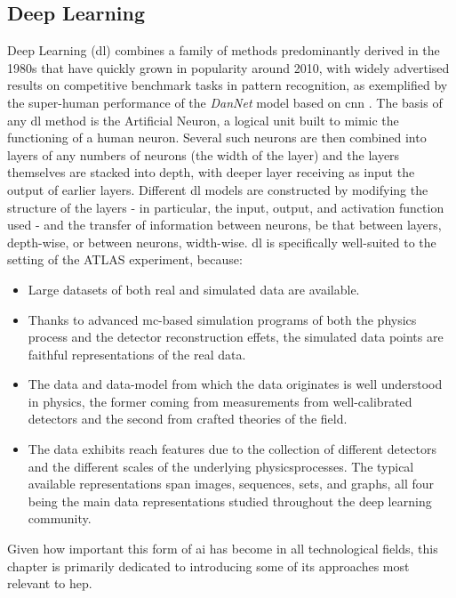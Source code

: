 \subsection{Deep Learning} 
Deep Learning (\gls{dl}) combines a family of methods predominantly derived in the 1980s that have quickly grown in popularity around 2010, with widely advertised results on competitive benchmark tasks in pattern recognition, as exemplified by the super-human performance of the \textit{DanNet} model \cite{DanNet} based on \gls{cnn} \cite{NIPS198953c3bce6}. The basis of any \gls{dl} method is the Artificial Neuron, a logical unit built to mimic the functioning of a human neuron. Several such neurons are then combined into layers of any numbers of neurons (the width of the layer) and the layers themselves are stacked into depth, with deeper layer receiving as input the output of earlier layers. Different \gls{dl} models are constructed by modifying the structure of the layers - in particular, the input, output, and activation function used - and the transfer of information between neurons, be that between layers, depth-wise, or between neurons, width-wise. \gls{dl} is specifically well-suited to the setting of the ATLAS experiment, because:
\begin{itemize}
    \item Large datasets of both real and simulated data are available.
    \item Thanks to advanced \gls{mc}-based simulation programs of both the physics process and the detector reconstruction effets, the simulated data points are faithful representations of the real data.
    \item The data and data-model from which the data originates is well understood in physics, the former coming from measurements from well-calibrated detectors and the second from crafted theories of the field. 
    \item The data exhibits reach features due to the collection of different detectors and the different scales of the underlying physicsprocesses. The typical available representations span images, sequences, sets, and graphs, all four being the main data representations studied throughout the deep learning community.
\end{itemize}
Given how important this form of \gls{ai} has become in all technological fields, this chapter is primarily dedicated to introducing some of its approaches most relevant to \gls{hep}. 


